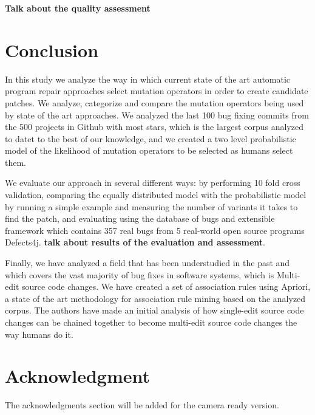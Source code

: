 \documentclass[conference]{IEEEtran}
\newcommand{\todo}[1]
  {{\scriptsize \textbf{\color{red} {#1}}}}
\begin{document}
\todo{Talk about the quality assessment}

\section{Conclusion} \label{conclusion}
In this study we analyze the way in which current state of the art automatic 
program repair approaches select mutation operators in order to create candidate 
patches. We analyze, categorize and compare the mutation operators being used by 
state of the art approaches. We analyzed the last 100 bug fixing commits from the
500 projects in Github with most stars, which is the largest corpus analyzed to datet
to the best of our knowledge, and we created a two level probabilistic model of
the likelihood of mutation operators to be selected as humans select them.

We evaluate our approach in several different ways: by performing 10 fold cross 
validation, comparing the equally distributed model with the probabilistic model by running a 
simple example and measuring the number of variants it takes to find the patch,
and evaluating using the database of bugs and extensible 
framework which contains 357 real bugs from 5 real-world open source programs Defects4j.
\todo{talk about results of the evaluation and assessment}.

Finally, we have analyzed a field that has been understudied in the past and which covers 
the vast majority of bug fixes in software systems, which is Multi-edit source code changes. 
We have created a set of association rules using Apriori, a state of the art
methodology for association rule mining based on the analyzed corpus. The authors have
made an initial analysis of how single-edit source code changes can be chained together 
to become multi-edit source code changes the way humans do it.





\section*{Acknowledgment}
The acknowledgments section will be added for the camera ready version. 





\end{document}
